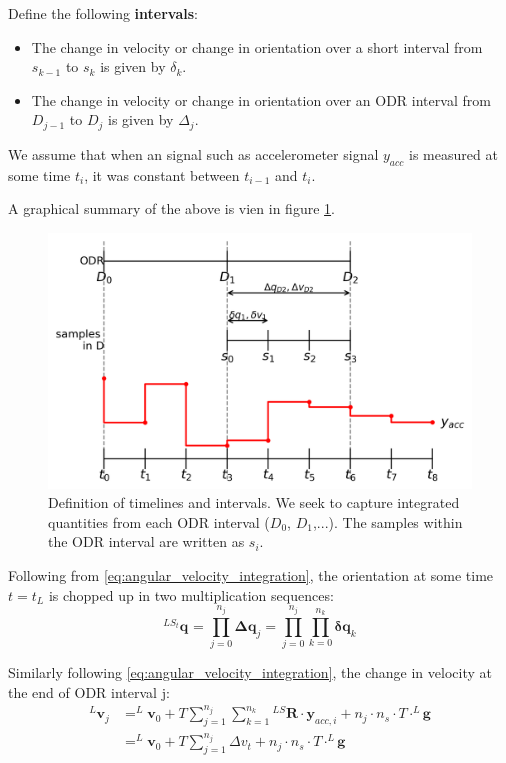 \documentclass{article}
\begin{document}
Define the following \textbf{intervals}:
\begin{itemize}
\item The change in velocity or change in orientation over a short interval from $s_{k-1}$ to $s_k$ is given by $\delta_k$.
\item The change in velocity or change in orientation over an ODR interval from $D_{j-1}$ to $D_j$ is given by $\Delta_j$.
\end{itemize}

We assume that when an signal such as accelerometer signal $y_{acc}$ is measured at some time $t_i$, it was constant between $t_{i-1}$ and $t_i$.

A graphical summary of the above is vien in figure \ref{fig:strapdown_integration_timelines}.

\begin{figure}[ht]
\includegraphics[scale=.8]{strapdown_integration_timelines.png} 
\caption{Definition of timelines and intervals.  We seek to capture integrated quantities from each ODR interval ($D_0$, $D_1$,...). The samples within the ODR interval are written as $s_i$.}
\centering
\label{fig:strapdown_integration_timelines}
\end{figure}

Following from \ref{eq:angular_velocity_integration}, the orientation at some time $t=t_L$ is chopped up in two multiplication sequences:
\begin{equation} \label{eq:orientation_chopped_up}
^{LS_t}\textbf{q}_{} = \prod_{j=0}^{n_j}\boldsymbol{\Delta q}_j
= \prod_{j=0}^{n_j} \prod_{k=0}^{n_k} \boldsymbol{\delta q}_k
\end{equation}

Similarly following \ref{eq:angular_velocity_integration}, the change in velocity at the end of ODR interval j:
\begin{equation} \label{eq:acceleration_chopped_up}
\begin{aligned}
^L\textbf{v}_{j} &= ^L\textbf{v}_0 + T \sum_{j=1}^{n_j} \sum_{k=1}^{n_k} {}^{LS}\boldsymbol{R} \cdot \boldsymbol{y}_{acc,i} +n_{j} \cdot n_s \cdot T \cdot ^L\boldsymbol{g} \\ 
&=  ^L\textbf{v}_0 + T \sum_{j=1}^{n_j} \Delta v_t + n_{j} \cdot n_s \cdot T \cdot ^L\boldsymbol{g}
\end{aligned}
\end{equation}
\end{document}
